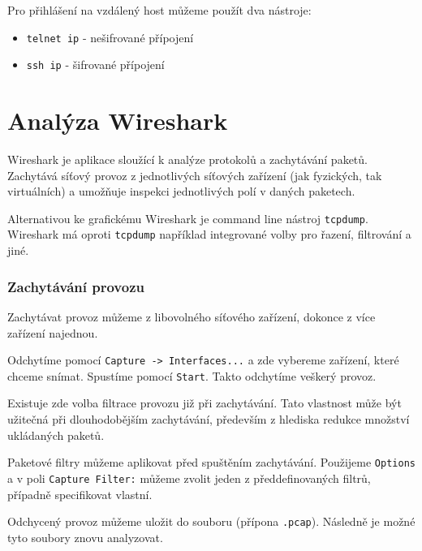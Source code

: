 Pro přihlášení na vzdálený host můžeme použít dva nástroje:
\begin{itemize}
				\item \texttt{telnet ip} - nešifrované přípojení
				\item \texttt{ssh ip} - šifrované přípojení
\end{itemize}



\section{Analýza Wireshark}
Wireshark je aplikace sloužící k analýze protokolů a zachytávání paketů. Zachytává síťový provoz z jednotlivých síťových zařízení (jak fyzických, tak virtuálních) a umožňuje inspekci jednotlivých polí v daných paketech.

Alternativou ke grafickému Wireshark je command line nástroj \texttt{tcpdump}. Wireshark má oproti \texttt{tcpdump} například integrované volby pro řazení, filtrování a jiné.


\subsubsection{Zachytávání provozu}
Zachytávat provoz můžeme z libovolného síťového zařízení, dokonce z více zařízení najednou.

Odchytíme pomocí \texttt{Capture -> Interfaces...} a zde vybereme zařízení, které chceme snímat. Spustíme pomocí \texttt{Start}. Takto odchytíme veškerý provoz.

Existuje zde volba filtrace provozu již při zachytávání. Tato vlastnost může být užitečná při dlouhodobějším zachytávání, především z hlediska redukce množství ukládaných paketů.

Paketové filtry můžeme aplikovat před spuštěním zachytávání. Použijeme \texttt{Options} a v poli \texttt{Capture Filter:} můžeme zvolit jeden z předdefinovaných filtrů, případně specifikovat vlastní.

Odchycený provoz můžeme uložit do souboru (přípona \texttt{.pcap}). Následně je možné tyto soubory znovu analyzovat.


